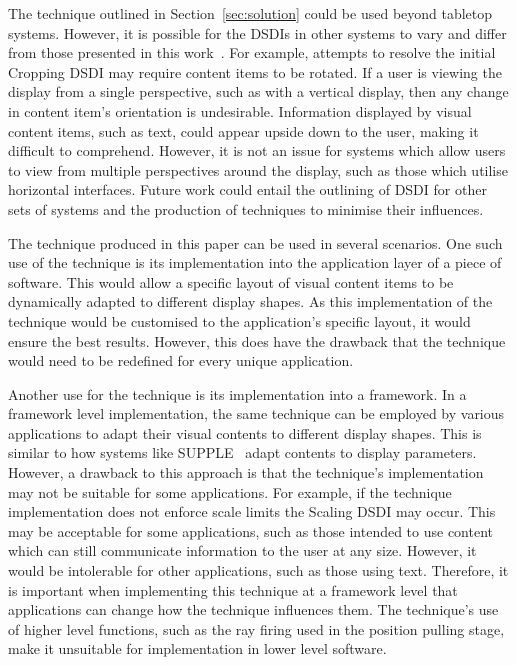 \documentclass[review,5p,times,twocolumn]{elsarticle}
\begin{document}
The technique outlined in Section~\ref{sec:solution} could be used beyond tabletop systems.
However, it is possible for the \acp{DSDI} in other systems to vary and differ from those presented in this work~\cite{Serrano2017}. 
For example, attempts to resolve the initial Cropping \ac{DSDI} may require content items to be rotated.
If a user is viewing the display from a single perspective, such as with a vertical display, then any change in content item's orientation is undesirable.
Information displayed by visual content items, such as text, could appear upside down to the user, making it difficult to comprehend.
However, it is not an issue for systems which allow users to view from multiple perspectives around the display, such as those which utilise horizontal interfaces.
Future work could entail the outlining of \ac{DSDI} for other sets of systems and the production of techniques to minimise their influences.

The technique produced in this paper can be used in several scenarios.
One such use of the technique is its implementation into the application layer of a piece of software.
This would allow a specific layout of visual content items to be dynamically adapted to different display shapes.
As this implementation of the technique would be customised to the application's specific layout, it would ensure the best results.
However, this does have the drawback that the technique would need to be redefined for every unique application.

Another use for the technique is its implementation into a framework.
In a framework level implementation, the same technique can be employed by various applications to adapt their visual contents to different display shapes.
This is similar to how systems like SUPPLE~\cite{Gajos2004} adapt contents to display parameters.
However, a drawback to this approach is that the technique's implementation may not be suitable for some applications.  
For example, if the technique implementation does not enforce scale limits the Scaling \ac{DSDI} may occur.
This may be acceptable for some applications, such as those intended to use content which can still communicate information to the user at any size.
However, it would be intolerable for other applications, such as those using text.
Therefore, it is important when implementing this technique at a framework level that applications can change how the technique influences them.
The technique's use of higher level functions, such as the ray firing used in the position pulling stage, make it unsuitable for implementation in lower level software.
\end{document}
